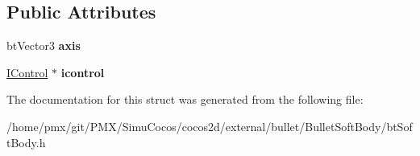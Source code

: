 \subsection*{Public Attributes}
\begin{DoxyCompactItemize}
\item 
\mbox{\label{structbtSoftBody_1_1AJoint_1_1Specs_ae043ee7fa63bf1cc3f35e89fa622a0cd}} 
bt\+Vector3 {\bfseries axis}
\item 
\mbox{\label{structbtSoftBody_1_1AJoint_1_1Specs_a1bc2eafb69ff1eb116ebbb0f5ad976e7}} 
\hyperlink{structbtSoftBody_1_1AJoint_1_1IControl}{I\+Control} $\ast$ {\bfseries icontrol}
\end{DoxyCompactItemize}


The documentation for this struct was generated from the following file\+:\begin{DoxyCompactItemize}
\item 
/home/pmx/git/\+P\+M\+X/\+Simu\+Cocos/cocos2d/external/bullet/\+Bullet\+Soft\+Body/bt\+Soft\+Body.\+h\end{DoxyCompactItemize}
